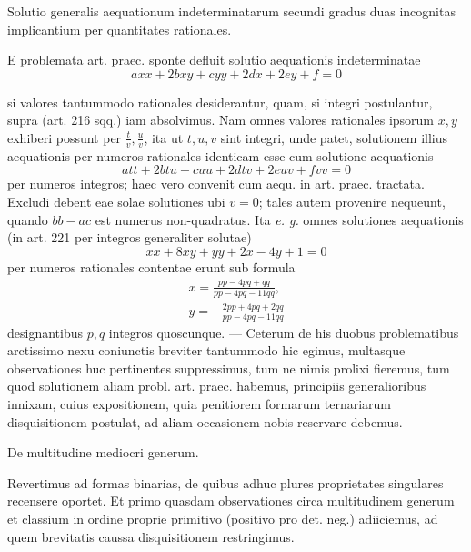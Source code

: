 \begin{center}Solutio generalis aequationum indeterminatarum secundi gradus duas incognitas implicantium per quantitates rationales.\end{center}


E problemata art. praec. sponte defluit solutio aequationis indeterminatae 
\[axx+2bxy+cyy+2dx+2ey+f=0\]

si valores tantummodo rationales desiderantur, quam, si integri postulantur, supra (art. 216 sqq.) iam absolvimus. Nam omnes valores rationales ipsorum \(x,y\) exhiberi possunt per \(\frac{t}{v},\frac{u}{v}\), ita ut \(t,u,v\) sint integri, unde patet, solutionem illius aequationis per numeros rationales identicam esse cum solutione aequationis 
\[att+2btu+cuu+2dtv+2euv+fvv=0\]
 per numeros integros; haec vero convenit cum aequ. in art. praec. tractata. Excludi debent eae solae solutiones ubi \(v=0\); tales autem provenire nequeunt, quando \(bb-ac\) est numerus non-quadratus. Ita \textit{e. g.} omnes solutiones aequationis (in art. 221 per integros generaliter solutae) 
\[xx+8xy+yy+2x-4y+1=0\]
 per numeros rationales contentae erunt sub formula 
\[\begin{gathered}x=\frac{pp-4pq+qq}{pp-4pq-11qq},\\ y=-\frac{2pp+4pq+2qq}{pp-4pq-11qq}\end{gathered}\]
 designantibus \(p,q\) integros quoscunque. — Ceterum de his duobus problematibus arctissimo nexu coniunctis breviter tantummodo hic egimus, multasque observationes huc pertinentes suppressimus, tum ne nimis prolixi fieremus, tum quod solutionem aliam probl. art. praec. habemus, principiis generalioribus innixam, cuius expositionem, quia penitiorem formarum ternariarum disquisitionem postulat, ad aliam occasionem nobis reservare debemus.

\begin{center}De multitudine mediocri generum.\end{center}


Revertimus ad formas binarias, de quibus adhuc plures proprietates singulares recensere oportet. Et primo quasdam observationes circa multitudinem generum et classium in ordine proprie primitivo (positivo pro det. neg.) adiiciemus, ad quem brevitatis caussa disquisitionem restringimus.

